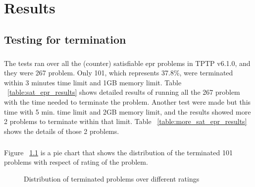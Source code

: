 \chapter{Results}\label{chap:res_and_lit}

\section{Testing for termination}

\paragraph{}
The tests ran over all the (counter) satisfiable \ac{epr} problems in TPTP v6.1.0, and they were 267 problem. Only 101, which represents 37.8\%, were terminated within 3 minutes time limit and 1GB memory limit. Table ~\ref{table:sat_epr_results} shows detailed results of running all the 267 problem with the time needed to terminate the problem.
Another test were made but this time with 5 min. time limit and 2GB memory limit, and the results showed more 2 problems to terminate within that limit. Table ~\ref{table:more_sat_epr_results} shows the details of those 2 problems.
\paragraph{}
Figure ~\ref{fig:res_dist} is a pie chart that shows the distribution of the terminated 101 problems with respect of rating of the problem. 


\begin{figure}[H]
\centering
{}
\caption{Distribution of terminated problems over different ratings\label{fig:res_dist}}
\end{figure}

